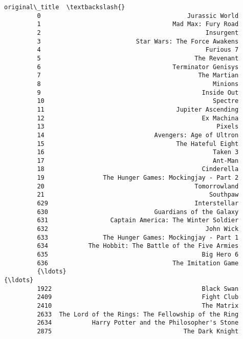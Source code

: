 \documentclass[11pt]{article}
\begin{document}
\begin{Verbatim}[commandchars=\\\{\}]
                                                  original\_title  \textbackslash{}
         0                                        Jurassic World   
         1                                    Mad Max: Fury Road   
         2                                             Insurgent   
         3                          Star Wars: The Force Awakens   
         4                                             Furious 7   
         5                                          The Revenant   
         6                                    Terminator Genisys   
         7                                           The Martian   
         8                                               Minions   
         9                                            Inside Out   
         10                                              Spectre   
         11                                    Jupiter Ascending   
         12                                           Ex Machina   
         13                                               Pixels   
         14                              Avengers: Age of Ultron   
         15                                    The Hateful Eight   
         16                                              Taken 3   
         17                                              Ant-Man   
         18                                           Cinderella   
         19                The Hunger Games: Mockingjay - Part 2   
         20                                         Tomorrowland   
         21                                             Southpaw   
         629                                        Interstellar   
         630                             Guardians of the Galaxy   
         631                 Captain America: The Winter Soldier   
         632                                           John Wick   
         633               The Hunger Games: Mockingjay - Part 1   
         634           The Hobbit: The Battle of the Five Armies   
         635                                          Big Hero 6   
         636                                  The Imitation Game   
         {\ldots}                                                 {\ldots}   
         1922                                         Black Swan   
         2409                                         Fight Club   
         2410                                         The Matrix   
         2633  The Lord of the Rings: The Fellowship of the Ring   
         2634           Harry Potter and the Philosopher's Stone   
         2875                                    The Dark Knight   

\end{Verbatim}
\end{document}
